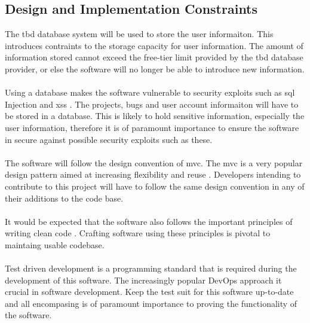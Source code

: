 \documentclass{article}
\newcommand{\comment}[1]{}
\begin{document}
\subsection{Design and Implementation Constraints}\label{designConstraints}
\comment{
Descirbe any items or issues that will limit the options available to developers. These might include: corporate or regulatory policies; hardware limitations (timing requirements, memory requirements); interfaces to other applications; specific technologies, tools, and databases to be used, parallel operations; language requirements; communication protocols; security considerations; design conventions or programming standards (for example, if the customer's organization will be responsible for maintaining delivered software).
}
The \acrshort{tbd} \gls{database} system will be used to store the user informaiton. This introduces contraints to the storage capacity for user information. The amount of information stored cannot exceed the free-tier limit provided by the \acrshort{tbd} \gls{database} provider, or else the software will no longer be able to introduce new information.
\\ \\
Using a \gls{database} makes the software vulnerable to security exploits such as \acrshort{sql} Injection \parencite{sql20} and \acrshort{xss} \parencite{xss20}. The projects, bugs and user account informaiton will have to be stored in a \gls{database}. This is likely to hold sensitive information, especially the user information, therefore it is of paramount importance to ensure the software in secure against possible security exploits such as these.
\\ \\
The software will follow the design convention of \acrshort{mvc}. The \acrlong{mvc} is a very popular design pattern aimed at increasing flexibility and reuse \parencite{designpatterns97}. Developers intending to contribute to this project will have to follow the same design convention in any of their additions to the code base.
\\ \\
It would be expected that the software also follows the important principles of writing clean code \parencite{cleancode08}. Crafting software using these principles is pivotal to maintaing usable codebase.
\\ \\
Test driven development is a programming standard that is required during the development of this software. The increasingly popular DevOps approach it crucial in software development. Keep the test suit for this software up-to-date and all encompasing is of paramount importance to proving the functionality of the software.
\end{document}
